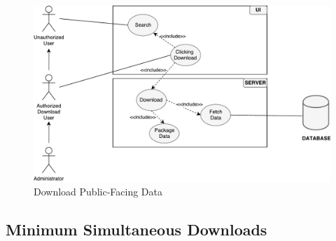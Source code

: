 \documentclass{article}
\begin{document}
\begin{figure}[H]
	\begin{center}
		\caption{Download Public-Facing Data}
		\label{FR1-use-case}
		\includegraphics[width=\textwidth]{images/download-use-case.pdf}
	\end{center}
\end{figure}

\subsection{Minimum Simultaneous Downloads}
\end{document}
